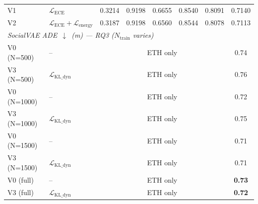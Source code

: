 \begin{table}[t]
{\begin{tabular}{l l c c c c c | c}
V1 & $\mathcal{L}_{\text{ECE}}$ & 0.3214 & 0.9198 & 0.6655 & 0.8540 & 0.8091 & 0.7140 \\
V2 & $\mathcal{L}_{\text{ECE}}+\mathcal{L}_{\text{energy}}$ & 0.3187 & 0.9198 & 0.6560 & 0.8544 & 0.8078 & 0.7113 \\
\midrule
\multicolumn{8}{l}{\textit{SocialVAE ADE~$\downarrow$~(m) — RQ3 ($N_{\text{train}}$ varies)}} \\
V0 (N=500)  & -- & \multicolumn{5}{c}{ETH only} & 0.74 \\
V3 (N=500)  & $\mathcal{L}_{\text{KL\_dyn}}$ & \multicolumn{5}{c}{ETH only} & 0.76 \\
V0 (N=1000) & -- & \multicolumn{5}{c}{ETH only} & 0.72 \\
V3 (N=1000) & $\mathcal{L}_{\text{KL\_dyn}}$ & \multicolumn{5}{c}{ETH only} & 0.75 \\
V0 (N=1500) & -- & \multicolumn{5}{c}{ETH only} & 0.71 \\
V3 (N=1500) & $\mathcal{L}_{\text{KL\_dyn}}$ & \multicolumn{5}{c}{ETH only} & 0.71 \\
V0 (full)   & -- & \multicolumn{5}{c}{ETH only} & \textbf{0.73} \\
V3 (full)   & $\mathcal{L}_{\text{KL\_dyn}}$ & \multicolumn{5}{c}{ETH only} & \textbf{0.72} \\
\bottomrule
\end{tabular}%
}
\end{table}